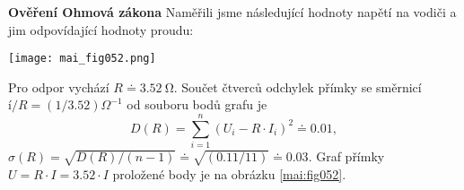 \wikitextrule
\begin{example}\label{mai:exam076}
  \textbf{Ověření Ohmová zákona}\newline\small
  Naměřili jsme následující hodnoty napětí na vodiči a jim odpovídající hodnoty proudu:
  
  \begin{table}[ht!]
    \centering
  \end{table}

  {\centering
   \captionsetup{type=figure}
   \texttt{[image: mai\_fig052.png]}
  \par}
  Pro odpor vychází \(R\doteq\SI{3.52}{\ohm} \). Součet čtverců odchylek přímky se směrnicí \(í/R = 
  (1/\num{3.52})\Omega^{-1}\) od souboru bodů grafu je
  \begin{equation*}
    D(R) = \sum_{i=1}^{n}(U_i - R\cdot I_i)^2 \doteq\num{0.01},
  \end{equation*}
  \(\sigma(R) = \sqrt{D(R)/(n-1)}\doteq\sqrt{(\num{0.11}/11)}\doteq\num{0.03}\).  Graf přímky \(U = 
  R\cdot I = \num{3.52}\cdot I\) proložené body je na obrázku \ref{mai:fig052}.
\normalsize
\end{example}